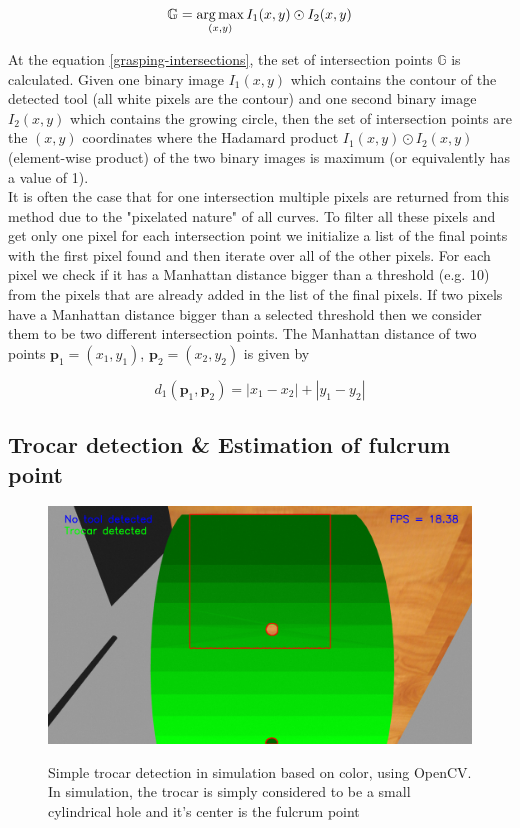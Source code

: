 \begin{equation}
\label{grasping-intersections}
\mathbb{G} = \operatorname*{arg\,max}_{(x,y)} I_1(x,y) \odot I_2(x,y)
\end{equation}

At the equation \ref{grasping-intersections}, the set of intersection points $\mathbb{G}$ is calculated. Given one binary image $I_1(x,y)$ which contains the contour of the detected tool (all white pixels are the contour) 
and one second binary image $I_2(x,y)$ which contains the growing circle, then the set of intersection points are the $(x, y)$ coordinates where the Hadamard product $I_1(x,y) \odot I_2(x,y)$ (element-wise product) of the 
two binary images is 
maximum (or equivalently has a value of 1).\\ 

It is often the case that for one intersection multiple pixels are returned from this method due to the "pixelated nature" of all curves. To filter all these pixels and get only one pixel for each intersection point 
we initialize a list of the final points with the first pixel found and then iterate over all of the other pixels. For each pixel we check if it has a Manhattan distance bigger than a threshold (e.g. 10) from the pixels that 
are already added in the list of the final pixels. If two pixels have a Manhattan distance bigger than a selected threshold then we consider them to be two different intersection points. The Manhattan distance of two 
points $\mathbf{p}_1=(x_1,y_1)$, ${\mathbf{p}_2=(x_2,y_2)}$ is given by

\begin{equation}
d_1(\mathbf{p}_1, \mathbf{p}_2) = |x_1 - x_2| + |y_1 - y_2|
\end{equation}

\subsection{Trocar detection \& Estimation of fulcrum point}

\begin{center}
\begin{figure}[H]
\centering
\includegraphics[width=12cm]{images/opencv-trocar-detection.png}\\
\caption{Simple trocar detection in simulation based on color, using OpenCV. In simulation, the trocar is simply considered to be a small 
cylindrical hole and it's center is the fulcrum point}
\end{figure}
\end{center}

